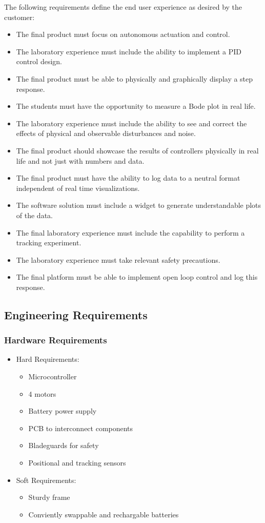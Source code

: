 \documentclass[12pt, titlepage]{article}
\begin{document}
The following requirements define the end user experience as desired by the customer:
  \begin{itemize}
    \item The final product must focus on autonomous actuation and control.
    \item The laboratory experience must include the ability to implement a PID control design.
    \item The final product must be able to physically and graphically display a step response.
    \item The students must have the opportunity to measure a Bode plot in real life.
    \item The laboratory experience must include the ability to see and correct the effects of physical and observable disturbances and noise.
    \item The final product should showcase the results of controllers physically in real life and not just with numbers and data.
    \item The final product must have the ability to log data to a neutral format independent of real time visualizations.
    \item The software solution must include a widget to generate understandable plots of the data.
    \item The final laboratory experience must include the capability to perform a tracking experiment.
    \item The laboratory experience must take relevant safety precautions.
    \item The final platform must be able to implement open loop control and log this response. 
  \end{itemize}
\subsection{Engineering Requirements}
\subsubsection{Hardware Requirements}
\begin{itemize}
  \item Hard Requirements:
  \begin{itemize}
    \item Microcontroller
    \item 4 motors
    \item Battery power supply
    \item PCB to interconnect components
    \item Bladeguards for safety
    \item Positional and tracking sensors
  \end{itemize}
  \item Soft Requirements:
  \begin{itemize}
    \item Sturdy frame
    \item Conviently swappable and rechargable batteries
  \end{itemize}
\end{itemize}
\end{document}
